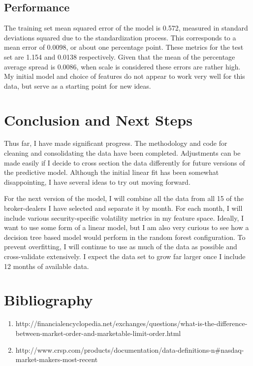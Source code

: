 \documentclass{article}
\begin{document}
\begin{multicols}{2}
\subsection{Performance}
\par
The training set mean squared error of the model is 0.572, measured in standard deviations squared due to the standardization process. This corresponds to a mean error of 0.0098, or about one percentage point. These metrics for the test set are 1.154 and 0.0138 respectively. 
Given that the mean of the percentage average spread is 0.0086, when scale is considered these errors are rather high. My initial model and choice of features do not appear to work very well for this data, but serve as a starting point for new ideas. 

\section{Conclusion and Next Steps}
\par
Thus far, I have made significant progress. The methodology and code for cleaning and consolidating the data have been completed. Adjustments can be made easily if I decide to cross section the data differently for future versions of the predictive model. Although the initial linear fit has been somewhat disappointing, I have several ideas to try out moving forward. 

\par
For the next version of the model, I will combine all the data from all 15 of the broker-dealers I have selected and separate it by month. For each month, I will include various security-specific volatility metrics in my feature space. Ideally, I want to use some form of a linear model, but I am also very curious to see how a decision tree based model would perform in the random forest configuration. To prevent overfitting, I will continue to use as much of the data as possible and cross-validate extensively. I expect the data set to grow far larger once I include 12 months of available data. 
\section{Bibliography}


\begin{enumerate}
\item http://financialencyclopedia.net/exchanges/questions/what-is-the-difference-between-market-order-and-marketable-limit-order.html
\item http://www.crsp.com/products/documentation/data-definitions-n\#nasdaq-market-makers-most-recent

\end{enumerate}
\end{multicols}
\end{document}
